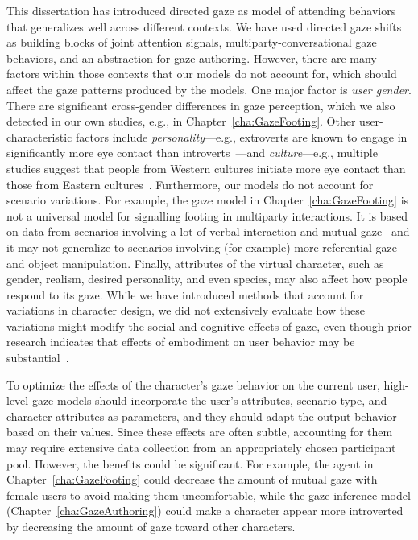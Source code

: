 This dissertation has introduced directed gaze as model of attending behaviors that generalizes well across different contexts. We have used directed gaze shifts as building blocks of joint attention signals, multiparty-conversational gaze behaviors, and an abstraction for gaze authoring. However, there are many factors within those contexts that our models do not account for, which should affect the gaze patterns produced by the models. One major factor is \emph{user gender}. There are significant cross-gender differences in gaze perception, which we also detected in our own studies, e.g., in Chapter~\ref{cha:GazeFooting}. Other user-characteristic factors include \emph{personality}---e.g., extroverts are known to engage in significantly more eye contact than introverts~\citep{rutter1972visual}---and \emph{culture}---e.g., multiple studies suggest that people from Western cultures initiate more eye contact than those from Eastern cultures~\citep{mccarthy2006cultural,mccarthy2008gaze}. Furthermore, our models do not account for scenario variations. For example, the gaze model in Chapter~\ref{cha:GazeFooting} is not a universal model for signalling footing in multiparty interactions. It is based on data from scenarios involving a lot of verbal interaction and mutual gaze~\citep{mutlu2012conversational} and it may not generalize to scenarios involving (for example) more referential gaze and object manipulation. Finally, attributes of the virtual character, such as gender, realism, desired personality, and even species, may also affect how people respond to its gaze. While we have introduced methods that account for variations in character design, we did not extensively evaluate how these variations might modify the social and cognitive effects of gaze, even though prior research indicates that effects of embodiment on user behavior may be substantial~\citep{parise1996my}.

To optimize the effects of the character's gaze behavior on the current user, high-level gaze models should incorporate the user's attributes, scenario type, and character attributes as parameters, and they should adapt the output behavior based on their values. Since these effects are often subtle, accounting for them may require extensive data collection from an appropriately chosen participant pool. However, the benefits could be significant. For example, the agent in Chapter~\ref{cha:GazeFooting} could decrease the amount of mutual gaze with female users to avoid making them uncomfortable, while the gaze inference model (Chapter~\ref{cha:GazeAuthoring}) could make a character appear more introverted by decreasing the amount of gaze toward other characters.

